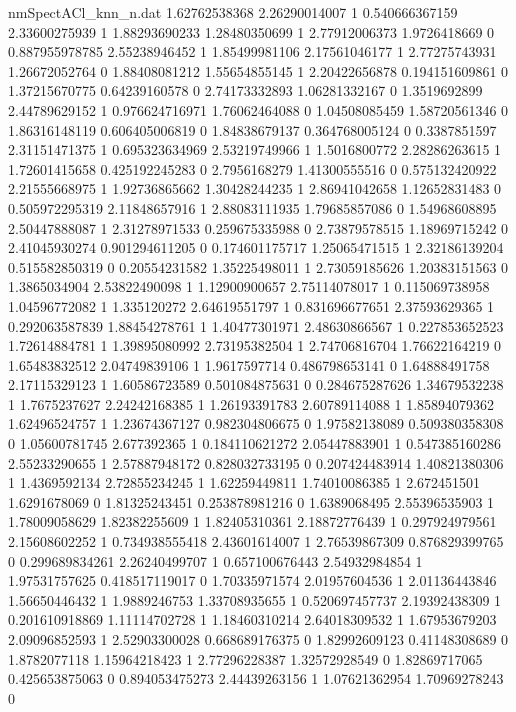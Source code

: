 \begin{filecontents}{nmSpectACl_knn_n.dat}
1.62762538368 2.26290014007 1
0.540666367159 2.33600275939 1
1.88293690233 1.28480350699 1
2.77912006373 1.9726418669 0
0.887955978785 2.55238946452 1
1.85499981106 2.17561046177 1
2.77275743931 1.26672052764 0
1.88408081212 1.55654855145 1
2.20422656878 0.194151609861 0
1.37215670775 0.64239160578 0
2.74173332893 1.06281332167 0
1.3519692899 2.44789629152 1
0.976624716971 1.76062464088 0
1.04508085459 1.58720561346 0
1.86316148119 0.606405006819 0
1.84838679137 0.364768005124 0
0.3387851597 2.31151471375 1
0.695323634969 2.53219749966 1
1.5016800772 2.28286263615 1
1.72601415658 0.425192245283 0
2.7956168279 1.41300555516 0
0.575132420922 2.21555668975 1
1.92736865662 1.30428244235 1
2.86941042658 1.12652831483 0
0.505972295319 2.11848657916 1
2.88083111935 1.79685857086 0
1.54968608895 2.50447888087 1
2.31278971533 0.259675335988 0
2.73879578515 1.18969715242 0
2.41045930274 0.901294611205 0
0.174601175717 1.25065471515 1
2.32186139204 0.515582850319 0
0.20554231582 1.35225498011 1
2.73059185626 1.20383151563 0
1.3865034904 2.53822490098 1
1.12900900657 2.75114078017 1
0.115069738958 1.04596772082 1
1.335120272 2.64619551797 1
0.831696677651 2.37593629365 1
0.292063587839 1.88454278761 1
1.40477301971 2.48630866567 1
0.227853652523 1.72614884781 1
1.39895080992 2.73195382504 1
2.74706816704 1.76622164219 0
1.65483832512 2.04749839106 1
1.9617597714 0.486798653141 0
1.64888491758 2.17115329123 1
1.60586723589 0.501084875631 0
0.284675287626 1.34679532238 1
1.7675237627 2.24242168385 1
1.26193391783 2.60789114088 1
1.85894079362 1.62496524757 1
1.23674367127 0.982304806675 0
1.97582138089 0.509380358308 0
1.05600781745 2.677392365 1
0.184110621272 2.05447883901 1
0.547385160286 2.55233290655 1
2.57887948172 0.828032733195 0
0.207424483914 1.40821380306 1
1.4369592134 2.72855234245 1
1.62259449811 1.74010086385 1
2.672451501 1.6291678069 0
1.81325243451 0.253878981216 0
1.6389068495 2.55396535903 1
1.78009058629 1.82382255609 1
1.82405310361 2.18872776439 1
0.297924979561 2.15608602252 1
0.734938555418 2.43601614007 1
2.76539867309 0.876829399765 0
0.299689834261 2.26240499707 1
0.657100676443 2.54932984854 1
1.97531757625 0.418517119017 0
1.70335971574 2.01957604536 1
2.01136443846 1.56650446432 1
1.9889246753 1.33708935655 1
0.520697457737 2.19392438309 1
0.201610918869 1.11114702728 1
1.18460310214 2.64018309532 1
1.67953679203 2.09096852593 1
2.52903300028 0.668689176375 0
1.82992609123 0.41148308689 0
1.8782077118 1.15964218423 1
2.77296228387 1.32572928549 0
1.82869717065 0.425653875063 0
0.894053475273 2.44439263156 1
1.07621362954 1.70969278243 0

\end{filecontents}
